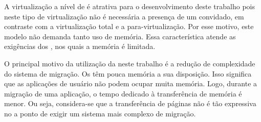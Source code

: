 A virtualização a nível de \so é atrativa para o desenvolvimento deste trabalho pois neste tipo de virtualização não é necessária a presença de um \so convidado, em contraste com a virtualização total e a para-virtualização. Por esse motivo, este modelo não demanda tanto uso de memória. Essa característica atende as exigências dos \lws, nos quais a memória é limitada.

O principal motivo da utilização da \precopymigration neste trabalho é a redução de complexidade do sistema de migração. Os \lws têm pouca memória a sua disposição. Isso significa que as aplicações de usuário não podem ocupar muita memória. Logo, durante a migração de uma aplicação, o tempo dedicado à transferência de memória é menor. Ou seja, considera-se que a transferência de páginas não é tão expressiva no \downtime a ponto de exigir um sistema mais complexo de migração.



